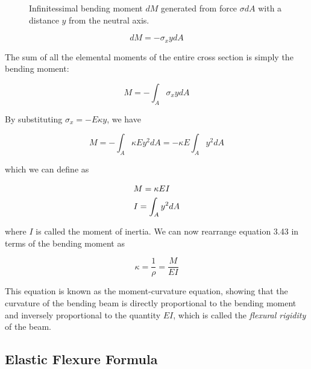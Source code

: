 \documentclass[
10pt,
a4paper,
openany,
svgnames,
]{book}
\begin{document}
\begin{figure}[h]
  \centering
  \caption[Moment-curvature formula derivation illustration]{Infinitessimal bending moment $dM$ generated from force $\sigma dA$ with a distance $y$ from the neutral axis.}
\end{figure}

\[dM =  - \sigma _xydA\]

The sum of all the elemental moments of the entire cross section is simply the bending moment:

\[M =  - \int_A \sigma_xydA \]

By substituting $\sigma_x = -E\kappa y$, we have

\[M =  - \int_A \kappa Ey^2dA  =  - \kappa E\int_A y^2dA \]

which we can define as

\[\begin{gathered}
  M = \kappa EI \hfill \\
  I = \int_A y^2dA  \hfill \\ 
\end{gathered} \]

where $I$ is called the moment of inertia. We can now rearrange equation 3.43 in terms of the bending moment as

\begin{equation} \label{eqn: moment-curvature}
  \kappa  = \frac{1}{\rho } = \frac{M}{EI}
\end{equation}

This equation is known as the moment-curvature equation, showing that the curvature of the bending beam is directly proportional to the bending moment and inversely proportional to the quantity $EI$, which is called the \emph{flexural rigidity} of the beam.

\subsection{Elastic Flexure Formula}
\end{document}
